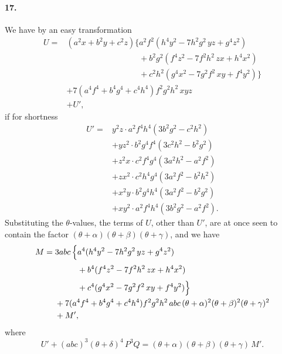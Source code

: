 \documentclass[11pt,a4paper]{article}
\begin{document}
\paragraph{17.}
We have by an easy transformation
\[
\begin{aligned}
U = {}& (a^2 x + b^2 y + c^2 z) \Biggl\{
   a^2 f^2 (h^4 y^2 - 7 h^2 g^2 \, yz + g^4 z^2) \\
& \phantom{(a^2 x + b^2 y + c^2 z) \Biggl\{} + b^2 g^2 (f^4 z^2 - 7 f^2 h^2 \, zx + h^4 x^2) \\
& \phantom{(a^2 x + b^2 y + c^2 z) \Biggl\{} + c^2 h^2 (g^4 x^2 - 7 g^2 f^2 \, xy + f^4 y^2) \Biggr\} \\
& + 7 (a^4 f^4 + b^4 g^4 + c^4 h^4) f^2 g^2 h^2 \, xyz \\
& + U',
\end{aligned}
\]
if for shortness
\[
\begin{aligned}
U' = {}& y^2 z \cdot a^2 f^4 h^4 (3 b^2 g^2 - c^2 h^2) \\
& + y z^2 \cdot b^2 g^4 f^4 (3 c^2 h^2 - b^2 g^2) \\
& + z^2 x \cdot c^2 f^4 g^4 (3 a^2 h^2 - a^2 f^2) \\
& + z x^2 \cdot c^2 h^4 g^4 (3 a^2 f^2 - b^2 h^2) \\
& + x^2 y \cdot b^2 g^4 h^4 (3 a^2 f^2 - b^2 g^2) \\
& + x y^2 \cdot a^2 f^4 h^4 (3 b^2 g^2 - a^2 f^2).
\end{aligned}
\]
Substituting the $\theta$-values, the terms of $U$, other than $U'$, are at once seen to
contain the factor $(\theta + \alpha)(\theta + \beta)(\theta + \gamma)$, and we have
\[
\begin{aligned}
M = {}& 3 abc \, \Bigl\{ a^4 (h^4 y^2 - 7 h^2 g^2 \, yz + g^4 z^2) \\
& \phantom{3 abc \, \Bigl\{} + b^4 (f^4 z^2 - 7 f^2 h^2 \, zx + h^4 x^2) \\
& \phantom{3 abc \, \Bigl\{} + c^4 (g^4 x^2 - 7 g^2 f^2 \, xy + f^4 y^2) \Bigr\} \\
& + 7 (a^4 f^4 + b^4 g^4 + c^4 h^4) f^2 g^2 h^2 \, abc \,
  (\theta + \alpha)^2 (\theta + \beta)^2 (\theta + \gamma)^2 \\
& + M',
\end{aligned}
\]
where
\[
U' + (abc)^3 (\theta + \delta)^4 \, P^3 Q
 = (\theta + \alpha)(\theta + \beta)(\theta + \gamma) \, M'.
\]
\end{document}
